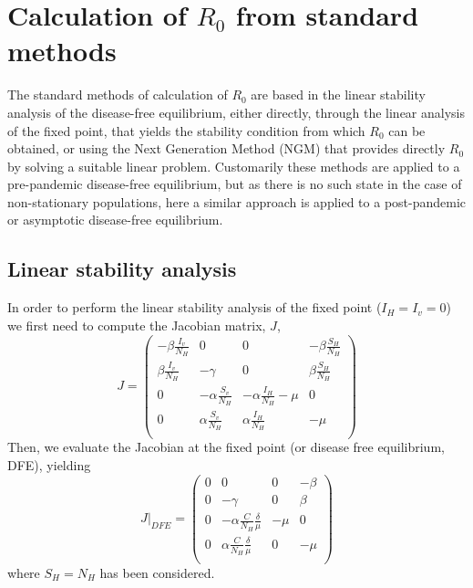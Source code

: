 \section{Calculation of $R_0$ from standard
  methods}\label{app:R0_standar_methods}

The standard methods of calculation of $R_0$ are based in the linear
stability analysis of the disease-free equilibrium, either directly, through
the linear analysis of the fixed point, that yields the stability condition
from which $R_0$ can be obtained, or using the Next Generation Method (NGM)
\cite{Diekmann2010} that provides directly $R_0$ by solving a suitable linear
problem. Customarily these methods are applied to a pre-pandemic disease-free
equilibrium, but as there is no such state in the case of non-stationary
populations, here a similar approach is applied to a post-pandemic or
asymptotic disease-free equilibrium.

\subsection*{Linear stability analysis}

In order to perform the linear stability analysis of the fixed point
($I_H=I_v=0$) we first need to compute the Jacobian matrix, $J$,
\begin{equation}
    J = \begin{pmatrix}
        -\beta \frac{I_v}{N_H} & 0                       & 0       & - \beta
        \frac{S_H}{N_H}                                                      \\
        \beta  \frac{I_v}{N_H} & -\gamma                 & 0       & \beta
        \frac{S_H}{N_H}                                                      \\
        0                      & -\alpha \frac{S_v}{N_H} & -\alpha
        \frac{I_H}{N_H} - \mu  & 0                                           \\
        0                      & \alpha \frac{S_v}{N_H}  & \alpha
        \frac{I_H}{N_H}        & - \mu                                       \\
    \end{pmatrix}
\end{equation}
Then, we evaluate the Jacobian at the fixed point (or disease
free equilibrium, DFE), yielding
\begin{equation}
    J\rvert_{DFE} = \begin{pmatrix}
        0     & 0                                       & 0 & - \beta \\
        0     & -\gamma                                 & 0 & \beta   \\
        0     & -\alpha \frac{C}{N_H}\frac{\delta}{\mu} &
        - \mu & 0                                                     \\
        0     & \alpha \frac{C}{N_H}\frac{\delta}{\mu}  & 0
              & - \mu                                                 \\
    \end{pmatrix}
    \label{eq:DFEmatrix}
\end{equation}
where $S_H=N_H$ has been considered.

